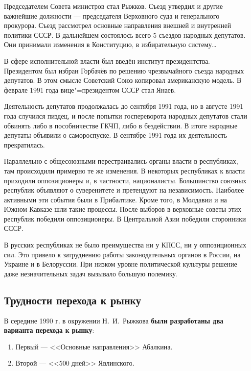 Председателем Совета министров стал Рыжков. Съезд утвердил и другие важнейшие должности --- председателя Верховного суда и генерального прокурора. Съезд рассмотрел основные направления внешней и внутренней политики СССР. В дальнейшем состоялось всего 5 съездов народных депутатов. Они принимали изменения в Конституцию, в избирательную систему\dots

В сфере исполнительной власти был введён институт президентства. Президентом был избран Горбачёв по решению чрезвычайного съезда народных депутатов. В этом смысле Советский Союз копировал американскую модель. В феврале 1991 года вице"=президентом СССР стал Янаев.

Деятельность депутатов продолжалась до сентября 1991 года, но в августе 1991 года случился пиздец, и после попытки госпереворота народных депутатов стали обвинять либо в пособничестве ГКЧП, либо в бездействии. В итоге народные депутаты объявили о самороспуске. В сентябре 1991 года их деятельность прекратилась.

Параллельно с общесоюзными перестраивались органы власти в республиках, там происходили примерно те же изменения. В некоторых республиках к власти приходили оппозиционеры и, в частности, националисты. Большинство союзных республик объявляют о суверенитете и претендуют на независимость. Наиболее активными эти события были в Прибалтике. Кроме того, в Молдавии и на Южном Кавказе шли такие процессы. После выборов в верховные советы этих республик победили оппозиционеры. В Центральной Азии победили сторонники СССР.

В русских республиках не было преимущества ни у КПСС, ни у оппозиционных сил. Это привело к затруднению работы законодательных органов в России, на Украине и в Белоруссии. При низком уровне политической культуры решение даже незначительных задач вызывало большую полемику.

\subsection{Трудности перехода к рынку}

В середине 1990 г. в окружении Н.~И.~Рыжкова \textbf{были разработаны два варианта перехода к рынку}:

\begin{enumerate}
    \item Первый --- <<Основные направления>> Абалкина.
    \item Второй --- <<500 дней>> Явлинского.
\end{enumerate}

